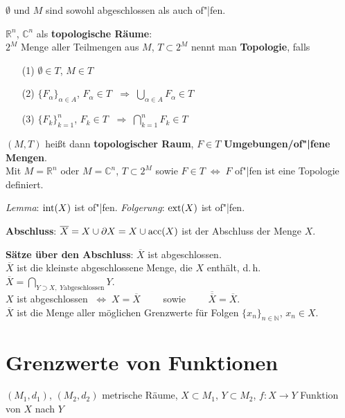 $\emptyset$ und $M$ sind sowohl abgeschlossen als auch of"|fen.

\linie

$\mathbb{R}^n$, $\mathbb{C}^n$ als \textbf{topologische Räume}: \\
$2^M$ Menge aller Teilmengen aus $M$, $T \subset 2^M$ nennt man
\textbf{Topologie}, falls

\begin{itemize}
    \item[(1)] $\emptyset \in T$, $M \in T$

    \item[(2)] $\{F_\alpha\}_{\alpha \in A}$, $F_\alpha \in T$
    $\;\Rightarrow\; \bigcup_{\alpha \in A} F_\alpha \in T$

    \item[(3)] $\{F_k\}_{k=1}^n$, $F_k \in T$
    $\;\Rightarrow\; \bigcap_{k=1}^n F_k \in T$
\end{itemize}

$(M,T)$ heißt dann \textbf{topologischer Raum}, $F \in T$
\textbf{Umgebungen/of"|fene Mengen}. \\
Mit $M = \mathbb{R}^n$ oder $M = \mathbb{C}^n$, $T \subset 2^M$ sowie
$F \in T \;\Leftrightarrow\; F$ of"|fen ist eine Topologie definiert.

\emph{Lemma}: $\operatorname{int}(X)$ ist of"|fen. \qquad
\emph{Folgerung}: $\operatorname{ext}(X)$ ist of"|fen.

\linie

\textbf{Abschluss}: $\overline{X} = X \cup \partial X = X \cup \operatorname{acc}(X)$ ist
der Abschluss der Menge $X$.

\textbf{Sätze über den Abschluss}:
$\overline{X}$ ist abgeschlossen. \\
$\overline{X}$ ist die kleinste abgeschlossene Menge, die $X$
enthält, d.\,h.
$\overline{X} = \bigcap_{Y \supset X,\; Y \text{abgeschlossen}} Y$. \\
$X$ ist abgeschlossen $\;\Leftrightarrow\; X = \overline{X} \qquad$ sowie
$\qquad \overline{\overline{X}} = \overline{X}$. \\
$\overline{X}$ ist die Menge aller möglichen Grenzwerte für Folgen
$\{x_n\}_{n \in \mathbb{N}}$, $x_n \in X$.

\section{%
    Grenzwerte von Funktionen%
}

$(M_1,d_1)$, $(M_2,d_2)$ metrische Räume, $X \subset M_1$, $Y \subset M_2$,
$f: X \rightarrow Y$ Funktion von $X$ nach $Y$

